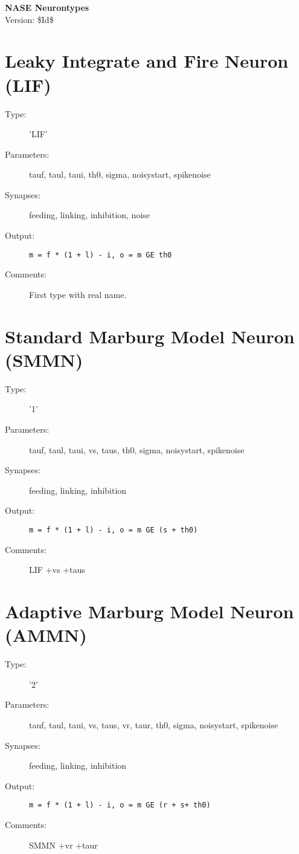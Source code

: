 \documentclass[12pt]{article}
\begin{document}
\begin{center}
{\Huge\textbf{NASE Neurontypes}}\\[2cm]
Version: \$Id$ $\$ 
\end{center}

\tableofcontents

\section{Leaky Integrate and Fire Neuron (LIF)}
\begin{description}
\item[Type:] 'LIF'

\item[Parameters:] tauf, taul, taui, th0, sigma, noisystart, spikenoise

\item[Synapses:] feeding, linking, inhibition, noise

\item[Output:] \texttt{m = f * (1 + l) - i, o = m GE th0}

\item[Comments:] First type with real name.
\end{description}



\section{Standard Marburg Model Neuron (SMMN)}
\begin{description}
\item[Type:] '1'

\item[Parameters:] tauf, taul, taui, vs, taus, th0, sigma, noisystart, spikenoise

\item[Synapses:] feeding, linking, inhibition

\item[Output:] \texttt{m = f * (1 + l) - i, o = m GE (s + th0)}

\item[Comments:] LIF +vs +taus
\end{description}



\section{Adaptive Marburg Model Neuron (AMMN)}
\begin{description}
\item[Type:] '2'

\item[Parameters:] tauf, taul, taui, vs, taus, vr, taur, th0, sigma, noisystart,
              spikenoise

\item[Synapses:] feeding, linking, inhibition

\item[Output:] \texttt{m = f * (1 + l) - i, o = m GE (r + s+ th0)}

\item[Comments:] SMMN +vr +taur
\end{description}
\end{document}
